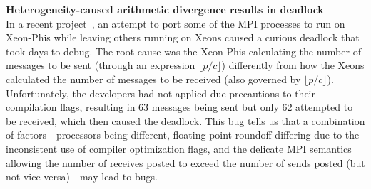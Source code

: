 \begin{WrapText}
\footnotesize
{\large \textbf{Heterogeneity-caused arithmetic divergence results in deadlock}}\\
  In a recent project~\cite{xsede13-porting-bug},
an attempt to port some of the MPI processes to run on
Xeon-Phis while leaving others running on Xeons
caused a curious deadlock that took days to debug.
%
The root cause was the Xeon-Phis calculating the number of
messages to be sent (through an expression
$\lfloor p/c\rfloor $) differently from how the Xeons calculated
the number of messages to be received (also governed by $\lfloor p/c\rfloor$).
%
Unfortunately, the developers had not applied due precautions
to their compilation flags, resulting in $63$ messages 
being sent but only $62$ attempted to be received, which
then caused the deadlock.
%
This bug tells us that a 
combination of factors---processors
being different, floating-point 
roundoff differing
due to the inconsistent use of 
compiler optimization flags, and
the delicate MPI semantics allowing
the number of receives posted to exceed
the number of sends posted (but not
vice versa)---may  lead to bugs.
\end{WrapText}